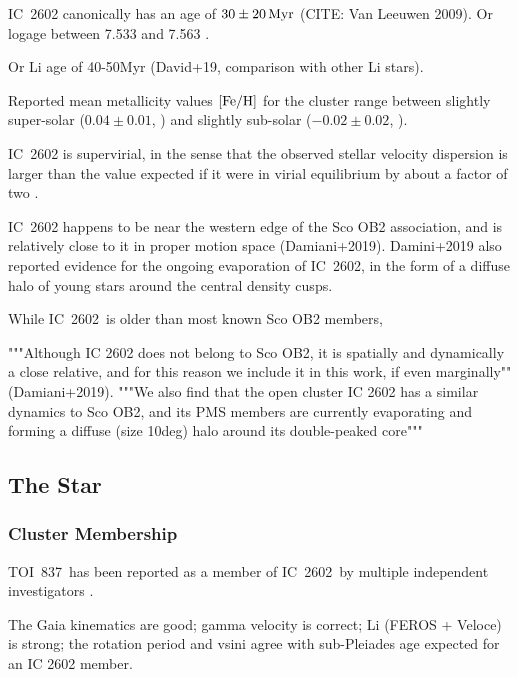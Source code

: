 \documentclass[12pt,twocolumn,tighten]{aastex62}
\newcommand{\tn}{TOI~837} %
\newcommand{\cn}{IC~2602} %
\begin{document}

IC~2602 canonically has an age of $30\pm20\,{\rm Myr}$ (CITE: Van
Leeuwen 2009).
Or logage between 7.533 and 7.563	\citep{bossini_age_2019}.

Or Li age of 40-50Myr (David+19, comparison with other Li stars).

Reported mean metallicity values ${\rm [Fe/H]}$ for the cluster range between
slightly super-solar ($0.04\pm0.01$, \citealt{baratella_gaia-eso_2020}) and
slightly sub-solar ($-0.02 \pm 0.02$, \citealt{netopil_metallicity_2016}).

IC~2602 is supervirial, in the sense that the observed stellar velocity
dispersion is larger than the value expected if it were in virial equilibrium
by about a factor of two \citep{bravi_gaia-eso_2018}.

IC~2602 happens to be near the western edge of the Sco OB2
association, and is relatively close to it in proper motion space
(Damiani+2019).
Damini+2019 also reported evidence for the ongoing evaporation of
\cn, in the form of a diffuse halo of young stars around the central
density cusps.

While \cn\ is older than most known Sco OB2 members,

"""Although IC 2602 does not belong to Sco OB2, it is
spatially and dynamically a close relative, and for this reason
we include it in this work, if even marginally"" (Damiani+2019).
"""We also find that the open cluster IC 2602 has a similar dynamics
to Sco OB2, and its PMS members are currently evaporating and forming
a diffuse (size 10deg) halo around its double-peaked core"""


\subsection{The Star}
\label{subsec:star}
\subsubsection{Cluster Membership}
\label{subsec:member}

\tn\ has been reported as a member of \cn\ by multiple independent 
investigators \citep{Kharchenko_et_al_2013,cantatgaudin_gaia_2018}.


The Gaia kinematics are good; gamma velocity is correct; Li (FEROS +
Veloce) is strong; the rotation period and vsini agree with
sub-Pleiades age expected for an IC 2602 member.
\end{document}
